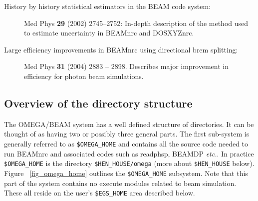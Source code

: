 \documentclass[12pt,twoside]{article}
\newcommand{\etc}{{\em etc.}}
\begin{document}
\begin{description}
\item[History by history statistical estimators in the BEAM code system:]
Med Phys {\bf 29} (2002) 2745--2752: In-depth description of the method used
to estimate uncertainty in BEAMnrc and DOSXYZnrc\cite{Wa02a}.

\item[Large efficiency improvements in BEAMnrc using directional
brem splitting:~~~] Med Phys {\bf 31} (2004) 2883 -- 2898. Describes
major improvement in efficiency for photon beam simulations\cite{Ka04a}.
 


\end{description}


\subsection{Overview of the directory structure}
\label{dirstructsect}

The OMEGA/BEAM system has a well defined structure of directories.  It
can be thought of as having two or possibly three general parts.  The
first sub-system is generally referred to as \verb+$OMEGA_HOME+ and
contains all the source code needed to run BEAMnrc and
associated codes such as readphsp, BEAMDP \etc.   In practice
\verb+$OMEGA_HOME+ is the directory {\tt \$HEN\_HOUSE/omega} (more
about {\tt \$HEN\_HOUSE} below).  Figure
~\ref{fig_omega_home} outlines the \verb+$OMEGA_HOME+ subsystem.
Note that this part of
the system contains no execute modules related to beam simulation.
These all reside on the user's {\tt \$EGS\_HOME} area described below.
\end{document}
